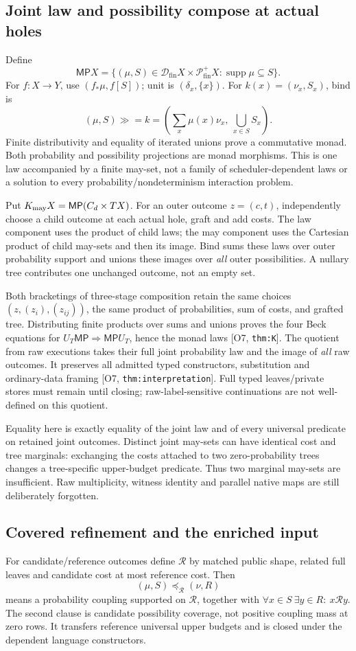 \documentclass[11pt,a4paper]{article}
\theoremstyle{definition}
\newcommand{\Dfin}{\mathcal D_{\mathrm{fin}}}
\newcommand{\Pfin}{\mathcal P_{\mathrm{fin}}^{+}}
\newcommand{\MayProb}{\mathsf{MP}}
\newcommand{\supp}{\operatorname{supp}}
\newcommand{\Addr}[2]{\textup{[#1, \texttt{#2}]}}
\begin{document}
\subsection{Joint law and possibility compose at actual holes}
Define
\[
 \MayProb X=\{(\mu,S)\in\Dfin X\times\Pfin X:\supp\mu\subseteq S\}.
\]
For \(f:X\to Y\), use \((f_*\mu,f[S])\); unit is
\((\delta_x,\{x\})\). For \(k(x)=(\nu_x,S_x)\), bind is
\[
 (\mu,S)\mathbin{\gg=}k=
 \left(\sum_x\mu(x)\nu_x,\ \bigcup_{x\in S}S_x\right).
\]
Finite distributivity and equality of iterated unions prove a commutative
monad. Both probability and possibility projections are monad morphisms.
This is one law accompanied by a finite may-set, not a family of
scheduler-dependent laws or a solution to every probability/nondeterminism
interaction problem.

Put \(K_{\rm may}X=\MayProb(C_d\times TX)\). For an outer outcome
\(z=(c,t)\), independently choose a child outcome at each actual hole,
graft and add costs. The law component uses the product of child laws;
the may component uses the Cartesian product of child may-sets and then
its image. Bind sums these laws over outer probability support and
unions these images over \emph{all} outer possibilities. A nullary tree
contributes one unchanged outcome, not an empty set.

Both bracketings of three-stage composition retain the same choices
\((z,(z_i),(z_{ij}))\), the same product of probabilities, sum of costs,
and grafted tree. Distributing finite products over sums and unions
proves the four Beck equations for
\(U_T\MayProb\Rightarrow\MayProb U_T\), hence the monad laws
\Addr{O7}{thm:K}. The quotient from raw executions takes their full
joint probability law and the image of \emph{all} raw outcomes. It
preserves all admitted typed constructors, substitution and ordinary-data
framing \Addr{O7}{thm:interpretation}. Full typed leaves/private stores
must remain until closing; raw-label-sensitive continuations are not
well-defined on this quotient.

Equality here is exactly equality of the joint law and of every universal
predicate on retained joint outcomes. Distinct joint may-sets can have
identical cost and tree marginals: exchanging the costs attached to two
zero-probability trees changes a tree-specific upper-budget predicate.
Thus two marginal may-sets are insufficient. Raw multiplicity, witness
identity and parallel native maps are still deliberately forgotten.

\subsection{Covered refinement and the enriched input}
For candidate/reference outcomes define \(\mathcal R\) by matched public
shape, related full leaves and candidate cost at most reference cost.
Then
\[
 (\mu,S)\preceq_{\mathcal R}(\nu,R)
\]
means a probability coupling supported on \(\mathcal R\), together
with \(\forall x\in S\ \exists y\in R:\ x\mathcal R y\).
The second clause is candidate possibility coverage, not positive coupling
mass at zero rows. It transfers reference universal upper budgets and
is closed under the dependent language constructors.
\end{document}
